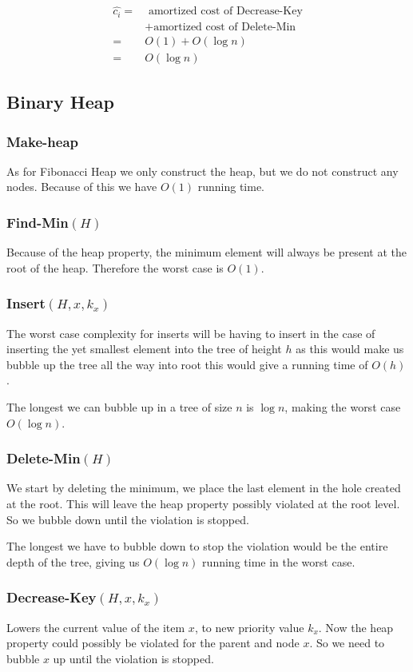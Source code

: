 \documentclass[a4paper,10pt]{article}
\begin{document}
\begin{align*}
\hat{c_i} =& \text{ amortized cost of Decrease-Key}\\
&+\text{amortized cost of Delete-Min}\\
=& O(1) + O(\log n)\\
=& O(\log n)
\end{align*}


\subsection{Binary Heap}
\subsubsection*{Make-heap}
As for Fibonacci Heap we only construct the heap, but we do not construct any nodes. Because of this we have $O(1)$ running time.

\subsubsection*{Find-Min$(H)$}
Because of the heap property, the minimum element will always be present at the root of the heap. Therefore the worst case is $O(1)$.

\subsubsection*{Insert$(H,x,k_x)$}
The worst case complexity for inserts will be having to insert in the case of inserting the yet smallest element into the tree of height $h$ as this would make us bubble up the tree all the way into root this would give a running time of $O(h)$.

The longest we can bubble up in a tree of size $n$ is $\log n$, making the worst case $O(\log n)$.
\subsubsection*{Delete-Min$(H)$}
We start by deleting the minimum, we place the last element in the hole created at the root. This will leave the heap property possibly violated at the root level. So we bubble down until the violation is stopped.

The longest we have to bubble down to stop the violation would be the entire depth of the tree, giving us $O(\log n)$ running time in the worst case.
\subsubsection*{Decrease-Key$(H, x, k_x)$}
Lowers the current value of the item $x$, to new priority value $k_x$. Now the heap property could possibly be violated for the parent and node $x$. So we need to bubble $x$ up until the violation is stopped.
\end{document}

